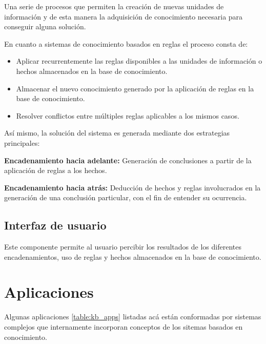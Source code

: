 Una serie de procesos que permiten la creaci\'on de nuevas unidades de informaci\'on y de esta manera la adquisici\'on de conocimiento necesaria para conseguir alguna soluci\'on.

En cuanto a sistemas de conocimiento basados en reglas el proceso consta de:

\begin{itemize}
    \item Aplicar recurrentemente las reglas disponibles a las unidades de informaci\'on o hechos almacenados en la base de conocimiento.
    \item Almacenar el nuevo conocimiento generado por la aplicaci\'on de reglas en la base de conocimiento.
    \item Resolver conflictos entre m\'ultiples reglas aplicables a los mismos casos.
\end{itemize}

As\'i mismo, la soluci\'on del sistema es generada mediante dos estrategias principales:

\textbf{Encadenamiento hacia adelante:} Generaci\'on de conclusiones a partir de la aplicaci\'on de reglas a los hechos.

\textbf{Encadenamiento hacia atr\'as:} Deducci\'on de hechos y reglas involucrados en la generaci\'on de una conclusi\'on particular, con el fin de entender su ocurrencia.

\subsection{Interfaz de usuario}

Este componente permite al usuario percibir los resultados de los diferentes encadenamientos, uso de reglas y hechos almacenados en la base de conocimiento.

\section{Aplicaciones}

Algunas aplicaciones \ref{table:kb_apps} listadas ac\'a est\'an conformadas por sistemas complejos que internamente incorporan conceptos de los sitemas basados en conocimiento. 


